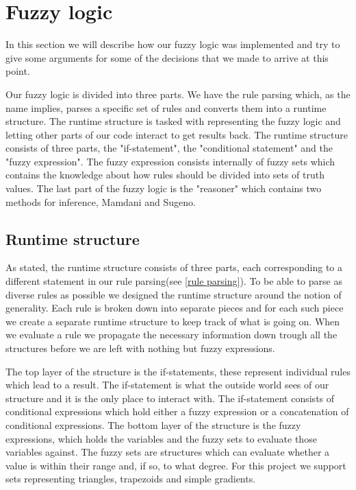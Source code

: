 \section{Fuzzy logic}\label{fuzzy logic}
In this section we will describe how our fuzzy logic was implemented and try to
give some arguments for some of the decisions that we made to arrive
at this point.

Our fuzzy logic is divided into three parts. We have the rule parsing which, as
the name implies, parses a specific set of rules and converts them into a runtime
structure. The runtime structure is tasked with representing the fuzzy logic and
letting other parts of our code interact to get results back. The runtime structure
consists of three parts, the "if-statement", the "conditional statement" and
the "fuzzy expression". The fuzzy expression consists internally of fuzzy sets
which contains the knowledge about how rules should be divided into sets of truth
values. The last part of the fuzzy logic is the "reasoner" which contains two 
methods for inference, Mamdani and Sugeno.

\subsection{Runtime structure}\label{runtime structure}
As stated, the runtime structure consists of three parts, each corresponding to
a different statement in our rule parsing(see \ref{rule parsing}). To be able
to parse as diverse rules as possible we designed the runtime structure around
the notion of generality. Each rule is broken down into separate pieces and for
each such piece we create a separate runtime structure to keep track of what
is going on. When we evaluate a rule we propagate the necessary information
down trough all the structures before we are left with nothing but fuzzy expressions.

The top layer of the structure is the if-statements, these represent individual
rules which lead to a result. The if-statement is what the outside world sees
of our structure and it is the only place to interact with. The if-statement
consists of conditional expressions which hold either a fuzzy expression or
a concatenation of conditional expressions. The bottom layer of the structure
is the fuzzy expressions, which holds the variables and the fuzzy sets to evaluate
those variables against. The fuzzy sets are structures which can evaluate whether
a value is within their range and, if so, to what degree. For this project
we support sets representing triangles, trapezoids and simple gradients.

